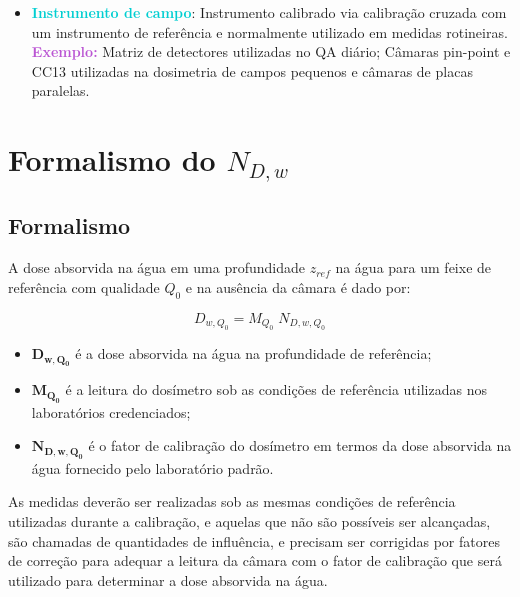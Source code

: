 \documentclass[11pt,a4paper]{article}
\newcounter{exemplo}
\begin{document}
\begin{itemize}
			\item \textcolor{DarkTurquoise}{\textbf{Instrumento de campo}}: Instrumento calibrado via calibração cruzada com um instrumento de referência e normalmente utilizado em medidas rotineiras. \textcolor{MediumOrchid}{\textbf{Exemplo:}} Matriz de detectores utilizadas no QA diário; Câmaras pin-point e CC13 utilizadas na dosimetria de campos pequenos e câmaras de placas paralelas.
		\end{itemize}

	\section{Formalismo do $N_{D,w}$}

	\subsection{Formalismo}

	A dose absorvida na água em uma profundidade $z_{ref}$ na água para um feixe de referência com qualidade $Q_0$ e na ausência da câmara é dado por:

  		\begin{equation}
			D_{w,Q_0} = M_{Q_0} \; N_{D,w,Q_{0}}
		\end{equation}
  		

  		\begin{exemplo}[onde:]
			\begin{itemize}[label=\textcolor{CarnationPink}{$\star$}]
				\item \textbf{\textcolor{CarnationPink}{$\mathbf{D_{w,Q_0}}$}} é a dose absorvida na água na profundidade de referência;
				\item \textbf{\textcolor{CarnationPink}{$\mathbf{M_{Q_0}}$}} é a leitura do dosímetro sob as condições de referência utilizadas nos laboratórios credenciados;
				\item \textbf{\textcolor{CarnationPink}{$\mathbf{N_{D,w,Q_{0}}}$}} é o fator de calibração  do dosímetro em termos da dose absorvida na água fornecido pelo laboratório padrão.
			\end{itemize}
		\end{exemplo}

	As medidas deverão ser realizadas sob as mesmas condições de referência utilizadas durante a calibração, e aquelas que não são possíveis ser alcançadas, são chamadas de quantidades de influência, e precisam ser corrigidas por fatores de correção para adequar a leitura da câmara com o fator de calibração que será utilizado para determinar a dose absorvida na água.
\end{document}
